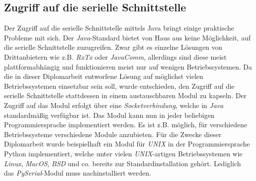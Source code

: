 \subsection{Zugriff auf die serielle Schnittstelle}
Der Zugriff auf die serielle Schnittstelle mittels Java bringt einige praktische Probleme mit sich.
Der \emph{Java}-Standard bietet von Haus aus keine Möglichkeit, auf die serielle Schnittstelle zuzugreifen.
Zwar gibt es einzelne Lösungen von Dritt\-an\-bie\-tern wie z.B. \emph{RxTx} oder \emph{JavaComm}, allerdings
sind diese meist plattformabhängig und funktionieren meist nur auf wenigen Betriebssystemen. Da die
in dieser Diplomarbeit entworfene Lösung auf möglichst vielen Betriebssystemen einsetzbar sein soll, 
wurde entschieden, den Zugriff auf die serielle Schnittstelle stattdessen in einem austauschbaren
Modul zu kapseln. Der Zugriff auf das Modul erfolgt über eine \emph{Socketverbindung}, welche in \emph{Java}
standardmäßig verfügbar ist. Das Modul kann nun in jeder beliebigen Programmiersprache implementiert
werden. Es ist z.B. möglich, für verschiedene Betriebssysteme verschiedene Module anzubieten.
Für die Zwecke dieser Diplomarbeit wurde beispielhaft ein Modul für \emph{UNIX} in der Programmiersprache
Python implementiert, welche unter vielen \emph{UNIX}-artigen Betriebssystemen wie \emph{Linux}, \emph{MacOS}, 
\emph{BSD} und co.  bereits zur Standardinstallation gehört. Lediglich das \emph{PySerial}-Modul muss nachinstalliert werden.

